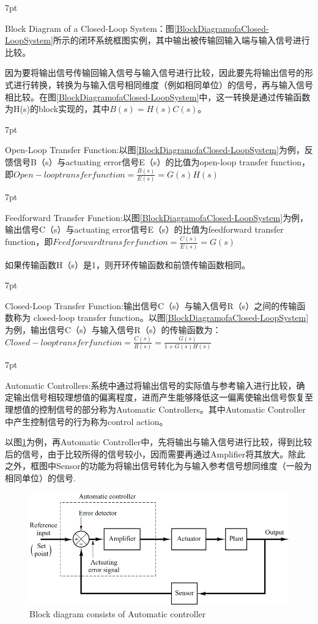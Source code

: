\documentclass{article}
\numberwithin{equation}{section}
\numberwithin{figure}{section}
\newenvironment{formal}{%
\def\FrameCommand{%
\hspace{1pt}%
{\color{DarkBlue}\vrule width 2pt}%
{\color{formalshade}\vrule width 4pt}%
\colorbox{formalshade}%
}%
\MakeFramed{\advance\hsize-\width\FrameRestore}%
\noindent\hspace{-4.55pt}%
\begin{adjustwidth}{}{7pt}%
\vspace{2pt}\vspace{2pt}%
}
{%
\vspace{2pt}\end{adjustwidth}\endMakeFramed%
}
\begin{document}
\begin{formal}
    Block Diagram of a Closed-Loop System：图\ref{BlockDiagramofaClosed-LoopSystem}所示的闭环系统框图实例，其中输出被传输回输入端与输入信号进行比较。
\end{formal}
因为要将输出信号传输回输入信号与输入信号进行比较，因此要先将输出信号的形式进行转换，转换为与输入信号相同维度（例如相同单位）的信号，再与输入信号相比较。在图\ref{BlockDiagramofaClosed-LoopSystem}中，这一转换是通过传输函数为H(s)的block实现的，其中$B(s)=H(s)C(s)$。
\begin{formal}
    Open-Loop Transfer Function:以图\ref{BlockDiagramofaClosed-LoopSystem}为例，反馈信号B（s）与actuating error信号E（s）的比值为open-loop transfer function，即$Open-loop transfer function = \frac{B(s)}{E(s)} = G(s)H(s)$
\end{formal}
\begin{formal}
    Feedforward Transfer Function:以图\ref{BlockDiagramofaClosed-LoopSystem}为例，输出信号C（s）与actuating error信号E（s）的比值为feedforward transfer function，即$Feedforward transfer function = \frac{C(s)}{E(s)} = G(s)$
\end{formal}
如果传输函数H（s）是1，则开环传输函数和前馈传输函数相同。
\begin{formal}
    Closed-Loop Transfer Function:输出信号C（s）与输入信号R（s）之间的传输函数称为 closed-loop transfer function。以图\ref{BlockDiagramofaClosed-LoopSystem}为例，输出信号C（s）与输入信号R（s）的传输函数为：
    $Closed-loop transfer function=\frac{C(s)}{R(s)}=\frac{G(s)}{1+G(s)H(s)}$
\end{formal}

\begin{formal}
    Automatic Controllers:系统中通过将输出信号的实际值与参考输入进行比较，确定输出信号相较理想值的偏离程度，进而产生能够降低这一偏离使输出信号恢复至理想值的控制信号的部分称为Automatic Controllers。其中Automatic Controller中产生控制信号的行为称为control action。
\end{formal}
以图\ref{Automaticcontroller}为例，再Automatic Controller中，先将输出与输入信号进行比较，得到比较后的信号，由于比较所得的信号较小，因而需要再通过Amplifier将其放大。除此之外，框图中Sensor的功能为将输出信号转化为与输入参考信号想同维度（一般为相同单位）的信号.
\begin{figure}
    \centering
    \includegraphics[width=.7\textwidth]{Chapter2/Automatic controller.png} %
    \caption{Block diagram consists of Automatic controller} %
    \label{Automaticcontroller} %
\end{figure}
\end{document}
